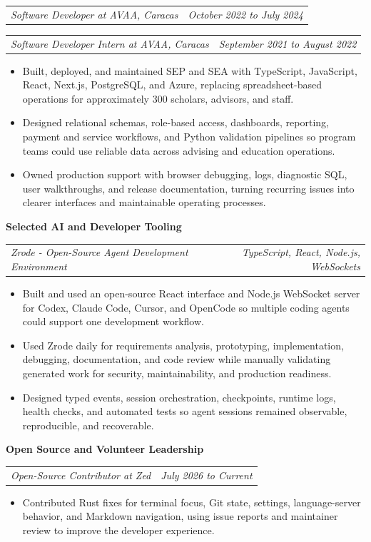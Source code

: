 \documentclass[10pt,letterpaper]{article}
\makeatletter
\newcommand{\bodyfont}{\fontsize{10.5}{15.75}\selectfont}
\newcommand{\sectiontitle}[1]{%
  \vspace{4pt}
  {\bodyfont\textbf{#1}}\par
  \nopagebreak[4]
  \vspace{2pt}
}
\newcommand{\roleline}[2]{%
  \begin{tabularx}{\textwidth}{@{}Xr@{}}
    \bodyfont\textit{#1} & \bodyfont\textit{#2}
  \end{tabularx}
  \nopagebreak[4]
  \vspace{1pt}
}
\makeatother
\begin{document}
\roleline{Software Developer at AVAA, Caracas}{October 2022 to July 2024}
\roleline{Software Developer Intern at AVAA, Caracas}{September 2021 to August 2022}
\begin{itemize}
  \item Built, deployed, and maintained SEP and SEA with TypeScript, JavaScript, React, Next.js, PostgreSQL, and Azure, replacing spreadsheet-based operations for approximately 300 scholars, advisors, and staff.
  \item Designed relational schemas, role-based access, dashboards, reporting, payment and service workflows, and Python validation pipelines so program teams could use reliable data across advising and education operations.
  \item Owned production support with browser debugging, logs, diagnostic SQL, user walkthroughs, and release documentation, turning recurring issues into clearer interfaces and maintainable operating processes.
\end{itemize}

\sectiontitle{Selected AI and Developer Tooling}

\roleline{Zrode - Open-Source Agent Development Environment}{TypeScript, React, Node.js, WebSockets}
\begin{itemize}
  \item Built and used an open-source React interface and Node.js WebSocket server for Codex, Claude Code, Cursor, and OpenCode so multiple coding agents could support one development workflow.
  \item Used Zrode daily for requirements analysis, prototyping, implementation, debugging, documentation, and code review while manually validating generated work for security, maintainability, and production readiness.
  \item Designed typed events, session orchestration, checkpoints, runtime logs, health checks, and automated tests so agent sessions remained observable, reproducible, and recoverable.
\end{itemize}

\sectiontitle{Open Source and Volunteer Leadership}

\roleline{Open-Source Contributor at Zed}{July 2026 to Current}
\begin{itemize}
  \item Contributed Rust fixes for terminal focus, Git state, settings, language-server behavior, and Markdown navigation, using issue reports and maintainer review to improve the developer experience.
\end{itemize}
\end{document}
